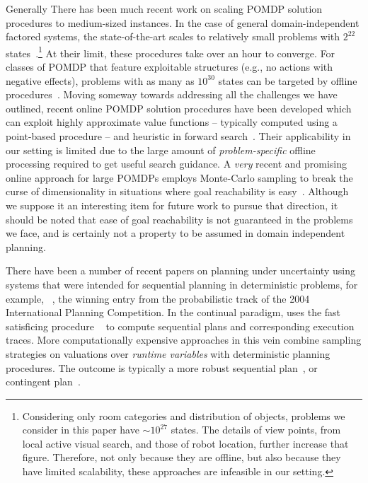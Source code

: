 Generally There has been much recent work on scaling POMDP solution procedures
to medium-sized instances. In the case of general domain-independent
factored systems, the state-of-the-art scales to relatively small
problems with $2^{22}$
states~\cite{shani:etal:2008}.\footnote{Considering only room
categories and distribution of objects, problems we consider in this
paper have $\sim 10^{27}$ states. The details of view points, from
local active visual search, and those of robot location, further
increase that figure. Therefore, not only because they are offline,
but also because they have limited scalability, these approaches are
infeasible in our setting.} At their limit, these procedures take over an
hour to converge.  For classes of POMDP that feature exploitable
structures (e.g., no actions with negative effects), problems with as
many as $10^{30}$ states can be targeted by offline
procedures~\cite{brunskill:russell:2010}. Moving someway towards
addressing all the challenges we have outlined, recent online POMDP
solution procedures have been developed which can exploit highly
approximate value functions -- typically computed using a point-based
procedure -- and heuristic in forward
search~\cite{ross:etal:2008}. Their applicability in our setting is
limited due to the large amount of
\emph{problem-specific} offline processing required to get useful
search guidance. A {\em very} recent and promising online approach for
large POMDPs employs Monte-Carlo sampling to break the curse of
dimensionality in situations where goal reachability is
easy~\cite{silver:veness:2010}. Although we suppose it an interesting
item for future work to pursue that direction, it should be noted that
ease of goal reachability is not guaranteed in the problems we face,
and is certainly not a property to be assumed in domain independent
planning.


There have been a number of recent papers on
planning under uncertainty using systems that were intended for
sequential planning in deterministic problems,  for example,
~\cite{yoon:etal:2007}, the winning entry from the
probabilistic track of the 2004 International Planning Competition.
In the continual paradigm,  uses the fast satisficing
procedure ~\cite{hoffmann:nebel:2001} to compute sequential
plans and corresponding execution traces.
More computationally expensive approaches in this vein combine
sampling strategies on valuations over {\em runtime variables} with
deterministic planning procedures. The outcome is typically a more
robust sequential plan~\cite{yoon:etal:2008}, or contingent
plan~\cite{majercik:2006}. 

